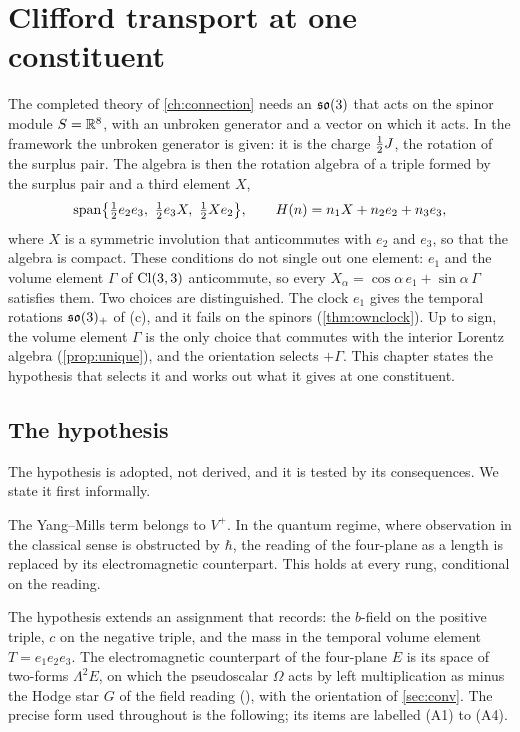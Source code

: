 \chapter{Clifford transport at one constituent}
\label{ch:hyp}

The completed theory of \cref{ch:connection} needs an $\mathfrak{so}(3)$ that acts on the spinor module $S=\mathbb{R}^8$, with an unbroken generator and a
vector on which it acts. In the framework the unbroken generator is given: it is the charge $\tfrac12 J$, the rotation of the surplus pair. The
algebra is then the rotation algebra of a triple formed by the surplus pair and a third element $X$,
\begin{equation}
\label{eq:triple}
\mathrm{span}\bigl\{\tfrac12 e_2e_3,\ \tfrac12 e_3X,\ \tfrac12 Xe_2\bigr\},\qquad H(n)=n_1X+n_2e_2+n_3e_3 ,
\end{equation}
where $X$ is a symmetric involution that anticommutes with $e_2$ and $e_3$, so that the algebra is compact. These conditions do not single
out one element: $e_1$ and the volume element $\Gamma$ of $\mathrm{Cl}(3,3)$ anticommute, so every $X_\alpha=\cos\alpha\,e_1+\sin\alpha\,\Gamma$
satisfies them. Two choices are distinguished. The clock $e_1$ gives the temporal rotations $\mathfrak{so}(3)_+$ of (c), and it fails on
the spinors (\cref{thm:ownclock}). Up to sign, the volume element $\Gamma$ is the only choice that commutes with the interior Lorentz algebra
(\cref{prop:unique}), and the orientation selects $+\Gamma$. This chapter states the hypothesis that selects it and works out what it gives at one constituent.

\section{The hypothesis}
\label{sec:hyp}

The hypothesis is adopted, not derived, and it is tested by its consequences. We state it first informally.

\begin{hypothesis}
\label{hyp:informal}
The Yang--Mills term belongs to $V^+$. In the quantum regime, where observation in the classical sense is obstructed by $\hbar$, the reading
of the four-plane as a length is replaced by its electromagnetic counterpart. This holds at every rung, conditional on the reading.
\end{hypothesis}

The hypothesis extends an assignment that  records: the $b$-field on the positive triple, $c$ on the negative triple, and the
mass in the temporal volume element $T=e_1e_2e_3$. The electromagnetic counterpart of the four-plane $E$ is its space of two-forms
$\Lambda^2E$, on which the pseudoscalar $\Omega$ acts by left multiplication as minus the Hodge star $G$ of the field reading
(), with the orientation of \cref{sec:conv}. The precise form used throughout is the following; its items are labelled (A1) to
(A4).


